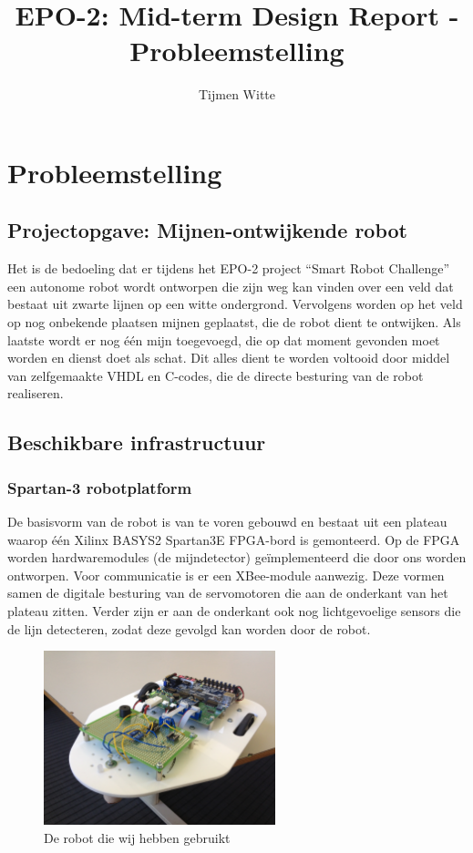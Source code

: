 \documentclass{report}
\title{EPO-2: Mid-term Design Report - Probleemstelling}
\author{Tijmen Witte}
\begin{document}
\chapter{Probleemstelling}
\label{ch:probleemstelling}

\section{Projectopgave: Mijnen-ontwijkende robot}

Het is de bedoeling dat er tijdens het EPO-2 project “Smart Robot Challenge” een autonome robot wordt ontworpen die zijn weg kan vinden over een veld dat bestaat uit zwarte lijnen op een witte ondergrond.
Vervolgens worden op het veld op nog onbekende plaatsen mijnen geplaatst, die de robot dient te ontwijken.
Als laatste wordt er nog één mijn toegevoegd, die op dat moment gevonden moet worden en dienst doet als schat.
Dit alles dient te worden voltooid door middel van zelfgemaakte VHDL en C-codes, die de directe besturing van de robot realiseren.


\section{Beschikbare infrastructuur}
\subsection{Spartan-3 robotplatform}

De basisvorm van de robot is van te voren gebouwd en bestaat uit een plateau waarop één Xilinx BASYS2 Spartan3E FPGA-bord is gemonteerd.
Op de FPGA worden hardwaremodules (de mijndetector) geïmplementeerd die door ons worden ontworpen.
Voor communicatie is er een XBee-module aanwezig.
Deze vormen samen de digitale besturing van de servomotoren die aan de onderkant van het plateau zitten.
Verder zijn er aan de onderkant ook nog lichtgevoelige sensors die de lijn detecteren, zodat deze gevolgd kan worden door de robot.

\begin{figure}[H]
	\centering
	\includegraphics[width=0.6\textwidth]{robot.jpg}
	\caption{De robot die wij hebben gebruikt}
	\label{fig:robot}
\end{figure}
\end{document}
